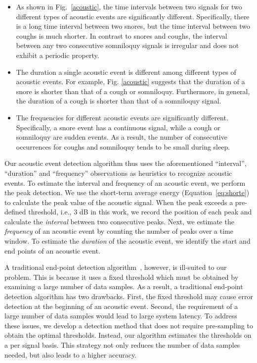  \begin{itemize}
\item As shown in Fig.~\ref{acoustic}, the time intervals between two signals for two different types of acoustic events are
    significantly different. Specifically, there is a long time interval between two snores, but the time interval between two coughs is
    much shorter. In contrast to snores and coughs, the interval between any two consecutive somniloquy signals is irregular and does not
    exhibit a periodic property.
 \item The duration a single acoustic event is different among different types of acoustic events. For example, Fig. \ref{acoustic}
     suggests that the duration of a snore is shorter than that of a cough or somniloquy. Furthermore, in general, the duration of a
     cough is shorter than that of a somniloquy signal.
\item The frequencies for different acoustic events are significantly different. Specifically, a snore event has a continuous signal,
    while a cough or somniloquy are sudden events. As a result, the number of consecutive occurrences for coughs and somniloquy tends to
    be small during sleep.
\end{itemize}


Our acoustic event detection algorithm thus uses the aforementioned ``interval'', ``duration'' and ``frequency'' observations as heuristics
to recognize acoustic events. To estimate the interval and frequency of an acoustic event, we perform the peak detection. We use the
short-term average energy (Equation~\ref{eq:shorte}) to calculate the peak value of the acoustic signal. When the peak exceeds a
pre-defined threshold, i.e., 3 dB in this work, we record the position of each peak and calculate the \emph{interval} between two
consecutive peaks. Next, we estimate the \emph{frequency} of an acoustic event by counting the number of peaks over a time window. To
estimate the \emph{duration} of the acoustic event, we identify the start and end points of an acoustic event.

A traditional end-point detection algorithm~\cite{stowell2015detection}, however, is ill-suited to our problem. This is because it uses a
fixed threshold which must be obtained by examining a large number of data samples. As a result, a traditional end-point detection
algorithm has two drawbacks. First, the fixed threshold may cause error detection at the beginning of an acoustic event. Second, the
requirement of a large number of data samples would lead to large system latency. To address these issues, we develop a detection method
that does not require pre-sampling to obtain the optimal thresholds. Instead, our algorithm estimates the thresholds on a per signal basis.
This strategy not only reduces the number of data samples needed, but also leads to a higher accuracy.

